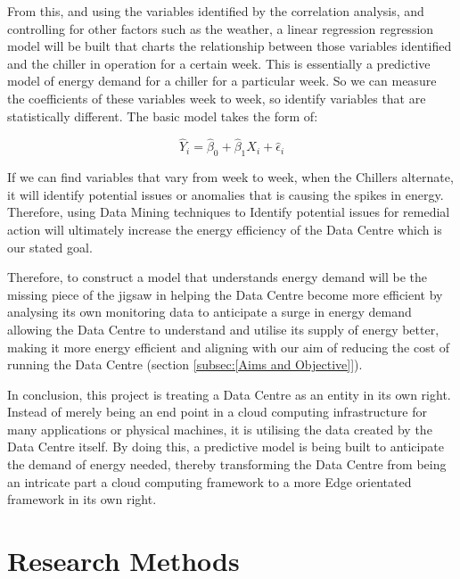 \documentclass[12pt]{scrartcl}
\begin{document}
 

From this, and using the variables identified by the correlation analysis, and controlling for other factors such as the weather, a linear regression regression model will be built that charts the relationship between those variables identified and the chiller in operation for a certain week. This is essentially a predictive model of energy demand for a chiller for a particular week. So we can measure the coefficients of these variables week to week, so identify variables that are statistically different. The basic model takes the form of:

\begin{equation}
\hat{Y}_i = \hat{\beta}_0 + \hat{\beta}_1 X_i + \hat{\epsilon}_i
\end{equation}


If we can find variables that vary from week to week, when the Chillers alternate, it will identify potential issues or anomalies that is causing the spikes in energy. Therefore, using Data Mining techniques to Identify potential issues for remedial action will ultimately increase the energy efficiency of the Data Centre which is our stated goal.      

 

Therefore, to construct a model that understands energy demand will be the missing piece of the jigsaw in helping the Data Centre become more efficient by analysing its own monitoring data to anticipate a surge in energy demand allowing the Data Centre to understand and utilise its supply of energy better, making it more energy efficient and aligning with our aim of reducing the cost of running the Data Centre (section \ref{subsec:[Aims and Objective]}).

 

In conclusion, this project is treating a Data Centre as an entity in its own right. Instead of merely being an end point in a cloud computing infrastructure for many applications or physical machines, it is utilising the data created by the Data Centre itself. By doing this, a predictive model is being built to anticipate the demand of energy needed, thereby transforming the Data Centre from being an intricate part a cloud computing framework to a more Edge orientated framework in its own right.    

 

\section{Research Methods}
\end{document}
